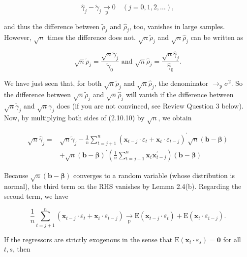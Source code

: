 \documentclass[10pt]{article}
\begin{document}
$$
\hat{\gamma}_{j}-\tilde{\gamma}_{j} \underset{\mathrm{p}}{\rightarrow} 0 \quad(j=0,1,2, \ldots),
$$

and thus the difference between $\tilde{\rho}_{j}$ and $\hat{\rho}_{j}$, too, vanishes in large samples.\\
However, $\sqrt{n}$ times the difference does not. $\sqrt{n} \tilde{\rho}_{j}$ and $\sqrt{n} \hat{\rho}_{j}$ can be written as


\begin{equation*}
\sqrt{n} \tilde{\rho}_{j}=\frac{\sqrt{n} \tilde{\gamma}_{j}}{\tilde{\gamma}_{0}} \text { and } \sqrt{n} \hat{\rho}_{j}=\frac{\sqrt{n} \hat{\gamma}_{j}}{\hat{\gamma}_{0}} . \tag{2.10.11}
\end{equation*}


We have just seen that, for both $\sqrt{n} \tilde{\rho}_{j}$ and $\sqrt{n} \hat{\rho}_{j}$, the denominator $\rightarrow_{\mathrm{p}} \sigma^{2}$. So the difference between $\sqrt{n} \tilde{\rho}_{j}$ and $\sqrt{n} \hat{\rho}_{j}$ will vanish if the difference between $\sqrt{n} \tilde{\gamma}_{j}$ and $\sqrt{n} \hat{\gamma}_{j}$ does (if you are not convinced, see Review Question 3 below). Now, by multiplying both sides of (2.10.10) by $\sqrt{n}$, we obtain


\begin{align*}
\sqrt{n} \hat{\gamma}_{j}= & \sqrt{n} \tilde{\gamma}_{j}-\frac{1}{n} \sum_{t=j+1}^{n}\left(\mathbf{x}_{t-j} \cdot \varepsilon_{t}+\mathbf{x}_{t} \cdot \varepsilon_{t-j}\right)^{\prime} \sqrt{n}(\mathbf{b}-\boldsymbol{\beta}) \\
& +\sqrt{n}(\mathbf{b}-\boldsymbol{\beta})^{\prime}\left(\frac{1}{n} \sum_{t=j+1}^{n} \mathbf{x}_{t} \mathbf{x}_{t-j}^{\prime}\right)(\mathbf{b}-\boldsymbol{\beta}) \tag{2.10.12}
\end{align*}


Because $\sqrt{n}(\mathbf{b}-\boldsymbol{\beta})$ converges to a random variable (whose distribution is normal), the third term on the RHS vanishes by Lemma 2.4(b). Regarding the second term, we have


\begin{equation*}
\frac{1}{n} \sum_{t=j+1}^{n}\left(\mathbf{x}_{t-j} \cdot \varepsilon_{t}+\mathbf{x}_{t} \cdot \varepsilon_{t-j}\right) \underset{\mathrm{p}}{\rightarrow} \mathrm{E}\left(\mathbf{x}_{t-j} \cdot \varepsilon_{t}\right)+\mathrm{E}\left(\mathbf{x}_{t} \cdot \varepsilon_{t-j}\right) . \tag{2.10.13}
\end{equation*}


If the regressors are strictly exogenous in the sense that $\mathrm{E}\left(\mathbf{x}_{t} \cdot \varepsilon_{s}\right)=\mathbf{0}$ for all $t, s$, then
\end{document}
